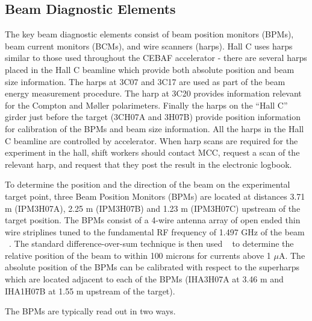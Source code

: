 \subsection{Beam Diagnostic Elements}

The key beam diagnostic elements consist of beam position
monitors (BPMs), beam current monitors (BCMs), and wire 
scanners (harps). Hall C uses harps similar to those used throughout
the CEBAF accelerator - there are several harps placed in the Hall C
beamline which provide both absolute position and beam size information.
The harps at 3C07 and 3C17 are used as part of the beam energy measurement
procedure.  The harp at 3C20 provides information relevant for the Compton
and M\o ller polarimeters. Finally the harps on the ``Hall C'' girder just before
the target (3CH07A and 3H07B) provide position information for calibration of the
BPMs and beam size information. All the harps in the Hall C beamline are controlled
by accelerator. When harp scans are required for the experiment in the hall, shift
workers should contact MCC, request a scan of the relevant harp, and request that
they post the result in the electronic logbook.

To determine the position and the direction of the beam on the experimental 
target point, three Beam Position Monitors (BPMs) are located at distances
3.71 m (IPM3H07A), 2.25 m (IPM3H07B) and 1.23 m (IPM3H07C) upstream of the target position. 
The BPMs consist of a 4-wire antenna array of open ended thin wire striplines 
tuned to the fundamental RF frequency of 1.497 GHz of the beam ~\cite{bi:bar90}. The 
standard difference-over-sum technique is then used ~\cite{bi:HW} to determine the 
relative position of the beam to within 100 microns for currents
above 1 $\mu $A. The absolute  position of the BPMs can be calibrated with respect to the 
superharps which are located adjacent to each of the BPMs (IHA3H07A 
at 3.46 m and IHA1H07B at 1.55 m upstream of the target).

The BPMs are typically read out in two ways.

